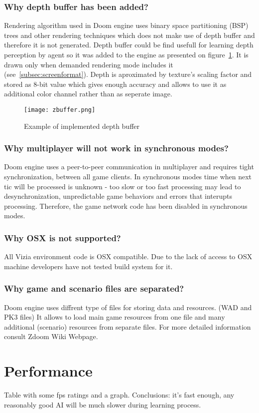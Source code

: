 \subsubsection{Why depth buffer has been added?}

Rendering algorithm used in Doom engine uses binary space partitioning (BSP) trees and other rendering techniques which does not make use of depth buffer and therefore it is not generated.
Depth buffer could be find usefull for learning depth perception by agent so it was added to the engine as presented on figure~\ref{fig:zbuffer}.
It is drawn only when demanded rendering mode includes it (see~\ref{subsec:screenformat}).
Depth is aproximated by texture's scaling factor and stored as 8-bit value which gives enough accuracy and allows to use it as additional color channel rather than as seperate image.

\begin{figure}
\centering
\texttt{[image: zbuffer.png]}
\caption{Example of implemented depth buffer}
\label{fig:zbuffer}
\end{figure}

\subsubsection{Why multiplayer will not work in synchronous modes?}

Doom engine uses a peer-to-peer communication in multiplayer and requires tight synchronization, between all game clients.
In synchronous modes time when next tic will be processed is unknown - too slow or too fast processing may lead to desynchronization, unpredictable game behaviors and errors that interupts processing. Therefore, the game network code has been disabled in synchronous modes.

\subsubsection{Why OSX is not supported?}

All Vizia environment code is OSX compatible. Due to the lack of access to OSX machine developers have not tested build system for it.

\subsubsection{Why game and scenario files are separated?}

Doom engine uses diffrent type of files for storing data and resources. (WAD and PK3 files) It allows to load main game resources from one file and many additional (scenario) resources from separate files. For more detailed information consult Zdoom Wiki Webpage\cite{zdoom-wiki}.

\section{Performance}\label{sec:performance}
Table with some fps ratings and a graph.
Conclusions: it's fast enough, any reasonably good AI will be much slower during learning process.



